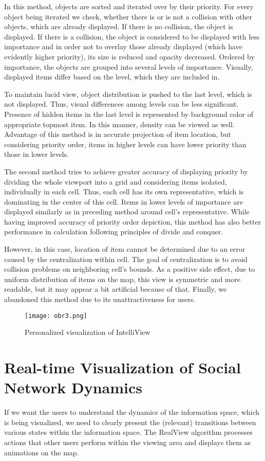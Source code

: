 \documentclass{llncs}
\begin{document}
In this method, objects are sorted and iterated over by their priority. For every object being iterated we check, whether there is or is not a collision with other objects, which are already displayed. If there is no collision, the object is displayed. If there is a collision, the object is considered to be displayed with less importance and in order not to overlay those already displayed (which have evidently higher priority), its size is reduced and opacity decreased. Ordered by importance, the objects are grouped into several levels of importance. Visually, displayed items differ based on the level, which they are included in.

To maintain lucid view, object distribution is pushed to the last level, which is not displayed. Thus, visual differences among levels can be less significant. Presence of hidden items in the last level is represented by background color of appropriate topmost item. In this manner, density can be viewed as well. Advantage of this method is in accurate projection of item location, but considering priority order, items in higher levels can have lower priority than those in lower levels.

The second method tries to achieve greater accuracy of displaying priority by dividing the whole viewport into a grid and considering items isolated, individually in each cell. Thus, each cell has its own representative, which is dominating in the center of this cell. Items in lower levels of importance are displayed similarly as in preceding method around cell's representative. While having improved accuracy of priority order depiction, this method has also better performance in calculation following principles of divide and conquer.

However, in this case, location of item cannot be determined due to an error caused by the centralization within cell. The goal of centralization is to avoid collision problems on neighboring cell's bounds. As a positive side effect, due to uniform distribution of items on the map, this view is symmetric and more readable, but it may appear a bit artificial because of that. Finally, we abandoned this method due to its unattractiveness for users.



\begin{figure}
\centering
\texttt{[image: obr3.png]}
\caption{Personalized visualization of IntelliView}
\end{figure}

\section{Real-time Visualization of Social Network Dynamics}
If we want the users to understand the dynamics of the information space, which is being visualized, we need to clearly present the (relevant) transitions between various states within the information space. The RealView algorithm processes actions that other users perform within the viewing area and displays them as animations on the map.
\end{document}
